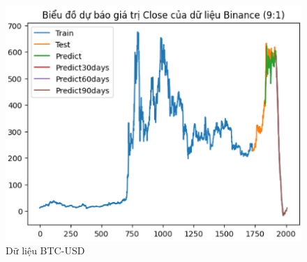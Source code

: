 \documentclass[conference]{IEEEtran}
\begin{document}
\begin{figure}[H]
\begin{minipage}{0.15\textwidth}
    \includegraphics[width=1\textwidth]{Figure/BNB91.png}
    \end{minipage}
    \caption{Dữ liệu BTC-USD}
    \label{fig:1}
\end{figure}
\end{document}
